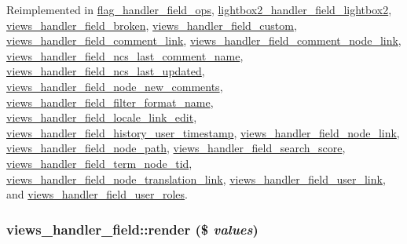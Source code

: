 Reimplemented in \hyperlink{classflag__handler__field__ops_a42722b03427da1e009f3b6075af703a}{flag\_\-handler\_\-field\_\-ops}, \hyperlink{classlightbox2__handler__field__lightbox2_be83b39eb7bab1582a1038543f59e277}{lightbox2\_\-handler\_\-field\_\-lightbox2}, \hyperlink{classviews__handler__field__broken_f6665205257b9b0e1dce732645f5dde1}{views\_\-handler\_\-field\_\-broken}, \hyperlink{classviews__handler__field__custom_153c21f3d05ff9f27e345f2c98058bc4}{views\_\-handler\_\-field\_\-custom}, \hyperlink{classviews__handler__field__comment__link_c19c2cedce77bfa9490624df9cd1eac2}{views\_\-handler\_\-field\_\-comment\_\-link}, \hyperlink{classviews__handler__field__comment__node__link_f48614fab00f4f6b8ec7e68a3d352b20}{views\_\-handler\_\-field\_\-comment\_\-node\_\-link}, \hyperlink{classviews__handler__field__ncs__last__comment__name_5394581513de0ee85a28aef8de302842}{views\_\-handler\_\-field\_\-ncs\_\-last\_\-comment\_\-name}, \hyperlink{classviews__handler__field__ncs__last__updated_9fdf82c20960c14abf4aaa37c578b299}{views\_\-handler\_\-field\_\-ncs\_\-last\_\-updated}, \hyperlink{classviews__handler__field__node__new__comments_b49cfad0c25d081f0ee70e2e0d0db809}{views\_\-handler\_\-field\_\-node\_\-new\_\-comments}, \hyperlink{classviews__handler__field__filter__format__name_3032499c14945a87535f1fdfbea57feb}{views\_\-handler\_\-field\_\-filter\_\-format\_\-name}, \hyperlink{classviews__handler__field__locale__link__edit_da85b88e681ca38a7c7d66deb133ae65}{views\_\-handler\_\-field\_\-locale\_\-link\_\-edit}, \hyperlink{classviews__handler__field__history__user__timestamp_bd6ff7a6d51f75781cf6ea6288612c07}{views\_\-handler\_\-field\_\-history\_\-user\_\-timestamp}, \hyperlink{classviews__handler__field__node__link_2c9b646801f273970403fea5ac4621b0}{views\_\-handler\_\-field\_\-node\_\-link}, \hyperlink{classviews__handler__field__node__path_59474fa6e78296b5f0c2aca6a951907e}{views\_\-handler\_\-field\_\-node\_\-path}, \hyperlink{classviews__handler__field__search__score_fda75fb726345ee91401d2f79ad2d313}{views\_\-handler\_\-field\_\-search\_\-score}, \hyperlink{classviews__handler__field__term__node__tid_8160a16d41604b141768dc313b6223b9}{views\_\-handler\_\-field\_\-term\_\-node\_\-tid}, \hyperlink{classviews__handler__field__node__translation__link_ccd7784b851085dadf55b773f1845097}{views\_\-handler\_\-field\_\-node\_\-translation\_\-link}, \hyperlink{classviews__handler__field__user__link_b64eedee54360407b203c3d7474c40f2}{views\_\-handler\_\-field\_\-user\_\-link}, and \hyperlink{classviews__handler__field__user__roles_26513786d88b63b1e2dcfd4aa09c4552}{views\_\-handler\_\-field\_\-user\_\-roles}.\hypertarget{classviews__handler__field_82ff951c5e9ceb97b2eab86f880cbc1e}{
\subsubsection[{render}]{\setlength{\rightskip}{0pt plus 5cm}views\_\-handler\_\-field::render (\$ {\em values})}}
\label{classviews__handler__field_82ff951c5e9ceb97b2eab86f880cbc1e}


